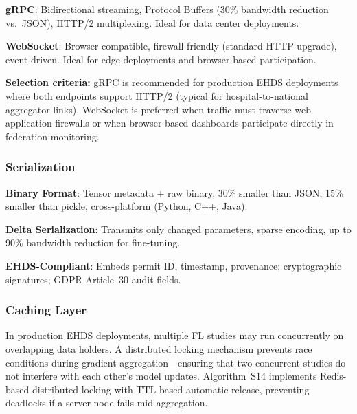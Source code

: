 \documentclass[conference]{IEEEtran}
\begin{document}
\textbf{gRPC}: Bidirectional streaming, Protocol Buffers (30\% bandwidth reduction vs.\ JSON), HTTP/2 multiplexing. Ideal for data center deployments.

\textbf{WebSocket}: Browser-compatible, firewall-friendly (standard HTTP upgrade), event-driven. Ideal for edge deployments and browser-based participation.

\textbf{Selection criteria:} gRPC is recommended for production EHDS deployments where both endpoints support HTTP/2 (typical for hospital-to-national aggregator links). WebSocket is preferred when traffic must traverse web application firewalls or when browser-based dashboards participate directly in federation monitoring.

\subsubsection{Serialization}

\textbf{Binary Format}: Tensor metadata + raw binary, 30\% smaller than JSON, 15\% smaller than pickle, cross-platform (Python, C++, Java).

\textbf{Delta Serialization}: Transmits only changed parameters, sparse encoding, up to 90\% bandwidth reduction for fine-tuning.

\textbf{EHDS-Compliant}: Embeds permit ID, timestamp, provenance; cryptographic signatures; GDPR Article~30 audit fields.

\subsubsection{Caching Layer}

In production EHDS deployments, multiple FL studies may run concurrently on overlapping data holders. A distributed locking mechanism prevents race conditions during gradient aggregation---ensuring that two concurrent studies do not interfere with each other's model updates. Algorithm~S14 implements Redis-based distributed locking with TTL-based automatic release, preventing deadlocks if a server node fails mid-aggregation.

\begin{figure}[htbp]
\centering
{}
\end{figure}
\end{document}
